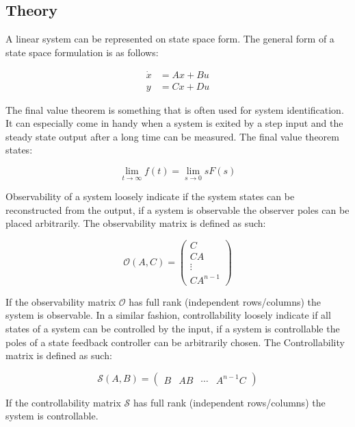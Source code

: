 \documentclass[a4paper, titlepage]{article}
\begin{document}
\subsection{Theory}
A linear system can be represented on state space form.
The general form of a state space formulation is as follows:

\begin{equation}
\begin{split}
\dot{x} &= Ax + Bu \\
y &= Cx + Du
\end{split}
\end{equation}


The final value theorem is something that is often used for system identification.
It can especially come in handy when a system is exited by a step input and the steady state output after a long time can be measured.
The final value theorem states:

\begin{equation}
\lim_{t \to \infty} f(t) = \lim_{s \to 0} sF(s)
\end{equation}

Observability of a system loosely indicate if the system states can be reconstructed from the output, if a system is observable the observer poles can be placed arbitrarily.
The observability matrix is defined as such:

\begin{equation}
\mathcal{O}(A,C) = 
\begin{pmatrix}
C \\ CA \\ \vdots \\ CA^{n-1}
\end{pmatrix}
\end{equation}

If the observability matrix $\mathcal{O}$ has full rank (independent rows/columns) the system is observable.
In a similar fashion, controllability loosely indicate if all states of a system can be controlled by the input, if a system is controllable the poles of a state feedback controller can be arbitrarily chosen.
The Controllability matrix is defined as such:

\begin{equation}
\mathcal{S}(A,B) = 
\begin{pmatrix}
B & AB & \cdots & A^{n-1}C
\end{pmatrix}
\end{equation}

If the controllability matrix $\mathcal{S}$ has full rank (independent rows/columns) the system is controllable.
\end{document}

